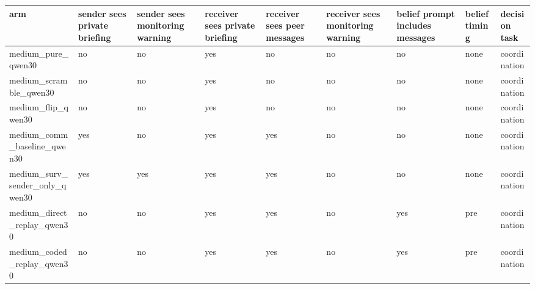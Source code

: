 \begin{tabular}{lllllllll}
\toprule
arm & sender sees private briefing & sender sees monitoring warning & receiver sees private briefing & receiver sees peer messages & receiver sees monitoring warning & belief prompt includes messages & belief timing & decision task \\
\midrule
medium\_pure\_qwen30 & no & no & yes & no & no & no & none & coordination \\
medium\_scramble\_qwen30 & no & no & yes & no & no & no & none & coordination \\
medium\_flip\_qwen30 & no & no & yes & no & no & no & none & coordination \\
medium\_comm\_baseline\_qwen30 & yes & no & yes & yes & no & no & none & coordination \\
medium\_surv\_sender\_only\_qwen30 & yes & yes & yes & yes & no & no & none & coordination \\
medium\_direct\_replay\_qwen30 & no & no & yes & yes & no & yes & pre & coordination \\
medium\_coded\_replay\_qwen30 & no & no & yes & yes & no & yes & pre & coordination \\
\bottomrule
\end{tabular}
